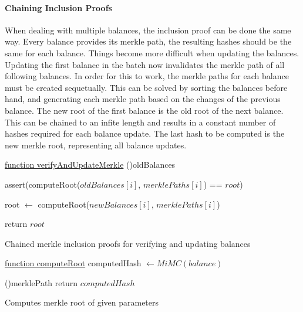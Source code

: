 \documentclass[../../thesis.tex]{subfiles}
\begin{document}
\paragraph{Chaining Inclusion Proofs} \label{chain_inclusion}
When dealing with multiple balances, the inclusion proof can be done the same way. Every balance provides its merkle path, the resulting hashes should be the same for each balance. Things become more difficult when updating the balances. Updating the first balance in the batch now invalidates the merkle path of all following balances. In order for this to work, the merkle paths for each balance must be created sequetually. This can be solved by sorting the balances before hand, and generating each merkle path based on the changes of the previous balance. The new root of the first balance is the old root of the next balance. This can be chained to an infite length and results in a constant number of hashes required for each balance update. The last hash to be computed is the new merkle root, representing all balance updates.


\begin{algorithm}

    \underline{function verifyAndUpdateMerkle}\;
    \ForEach(){oldBalances}
    {
        assert(computeRoot($oldBalances[i]$, $merklePaths[i]$) == $root$)

        root $\gets$ computeRoot($newBalances[i]$, $merklePaths[i]$)
    }

    return $root$

    \caption{Chained merkle inclusion proofs for verifying and updating balances}
\end{algorithm}

\begin{algorithm}

    \underline{function computeRoot}\;
    computedHash $\gets MiMC(balance)$

    \ForEach(){merklePath}
    {
    }
    return $computedHash$
    \caption{Computes merkle root of given parameters}
\end{algorithm}
\end{document}

